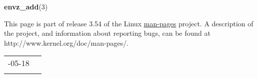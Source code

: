 \documentclass[]{article}
\let\realtextbf=\textbf
\renewcommand{\textbf}[1]{\textcolor{boldcolor}{\realtextbf{#1}}}
\renewcommand{\emph}[1]{\underline{#1}}
\begin{document}
\textbf{envz\_add}(3)


This page is part of release 3.54 of the Linux \emph{man-pages} project.
A description of the project, and information about reporting bugs, can
be found at http://www.kernel.org/doc/man-pages/.

\begin{longtable}[c]{@{}ll@{}}
\toprule\addlinespace
2007-05-18 &
\\\addlinespace
\bottomrule
\end{longtable}
\end{document}
